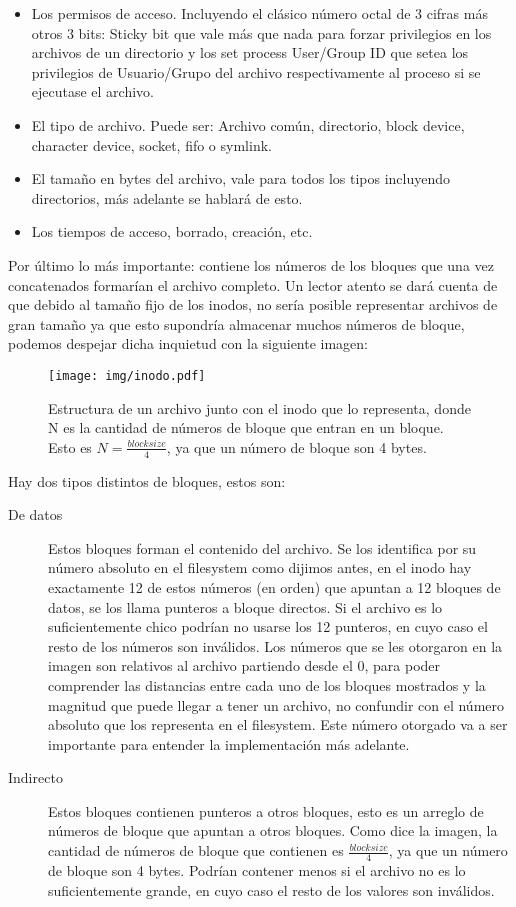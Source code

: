 \begin{itemize}
\item Los permisos de acceso. Incluyendo el clásico número octal de 3 cifras más otros 3 bits: Sticky bit que vale más que nada para forzar privilegios en los archivos de un directorio y los set process User/Group ID que setea los privilegios de Usuario/Grupo del archivo respectivamente al proceso si se ejecutase el archivo.
\item El tipo de archivo. Puede ser: Archivo común, directorio, block device, character device, socket, fifo o symlink.
\item El tamaño en bytes del archivo, vale para todos los tipos incluyendo directorios, más adelante se hablará de esto.
\item Los tiempos de acceso, borrado, creación, etc.
\end{itemize}

Por último lo más importante: contiene los números de los bloques que una vez concatenados formarían el archivo completo. Un lector atento se dará cuenta de que debido al tamaño fijo de los inodos, no sería posible representar archivos de gran tamaño ya que esto supondría almacenar muchos números de bloque, podemos despejar dicha inquietud con la siguiente imagen:

\begin{figure}[H]
 \centering
 \texttt{[image: img/inodo.pdf]}
 \caption{Estructura de un archivo junto con el inodo que lo representa, donde N es la cantidad de números de bloque que entran en un bloque. Esto es $N = \frac{block size}4$, ya que un número de bloque son 4 bytes.}
\end{figure}

\pagebreak

Hay dos tipos distintos de bloques, estos son:

\begin{description}
\item[De datos] Estos bloques forman el contenido del archivo. Se los identifica por su número absoluto en el filesystem como dijimos antes, en el inodo hay exactamente 12 de estos números (en orden) que apuntan a 12 bloques de datos, se los llama punteros a bloque directos. Si el archivo es lo suficientemente chico podrían no usarse los 12 punteros, en cuyo caso el resto de los números son inválidos. Los números que se les otorgaron en la imagen son relativos al archivo partiendo desde el 0, para poder comprender las distancias entre cada uno de los bloques mostrados y la magnitud que puede llegar a tener un archivo, no confundir con el número absoluto que los representa en el filesystem. Este número otorgado va a ser importante para entender la implementación más adelante.
\item[Indirecto] Estos bloques contienen punteros a otros bloques, esto es un arreglo de números de bloque que apuntan a otros bloques.
  Como dice la imagen, la cantidad de números de bloque que contienen es $\frac{block size}{4}$, ya que un número de bloque son 4 bytes. Podrían contener menos si el archivo no es lo suficientemente grande, en cuyo caso el resto de los valores son inválidos.
\end{description}

